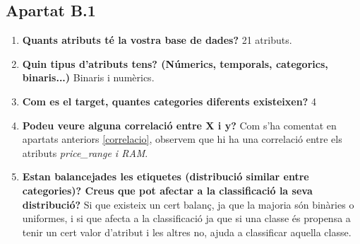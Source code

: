 \documentclass[a4paper, 11pt]{article}
\begin{document}
\subsection{Apartat B.1}
\begin{enumerate}
    \item \textbf{Quants atributs té la vostra base de dades?} 21 atributs.
    \item \textbf{Quin tipus d'atributs tens? (Númerics, temporals, categorics, binaris...)} 
    Binaris i numèrics.
    \item \textbf{Com es el target, quantes categories diferents existeixen?} 4 
    \item \textbf{Podeu veure alguna correlació entre X i y?} Com s'ha comentat en apartats anteriors \textcolor{blue}{\ref{correlacio}}, observem que hi ha una correlació entre els atributs \textit{price\_range i RAM}.
    \item \textbf{Estan balancejades les etiquetes (distribució similar entre categories)? Creus que pot afectar a la classificació la seva distribució?} Si que existeix un cert balanç, ja que la majoria són binàries o uniformes, i si que afecta a la classificació ja que si una classe és propensa a tenir un cert valor d'atribut i les altres no, ajuda a classificar aquella classe. 
\end{enumerate}

\newpage
\end{document}
